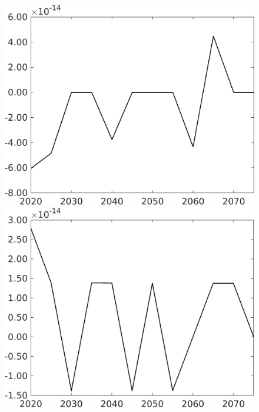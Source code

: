 \begin{figure}[h!!]
\begin{minipage}[]{0.32\textwidth}
\end{minipage}		
\begin{minipage}[]{0.32\textwidth}
\includegraphics[width=1\textwidth]{../../codding_model/own_basedOnFried/optimalPol_010922_revision/figures/all_13Sept22/CompTaul_Equlab_LFBAUPer_Reg0_pee_spillover0_nsk1_xgr1_knspil0_sep1_countec0_GovRev1_etaa0.79.png}
\end{minipage}	
\begin{minipage}[]{0.32\textwidth}
\includegraphics[width=1\textwidth]{../../codding_model/own_basedOnFried/optimalPol_010922_revision/figures/all_13Sept22/CompTaul_Equlab_LFBAUPer_Reg0_pn_spillover0_nsk1_xgr1_knspil0_sep1_countec0_GovRev1_etaa0.79.png}

\end{minipage}
\end{figure}
